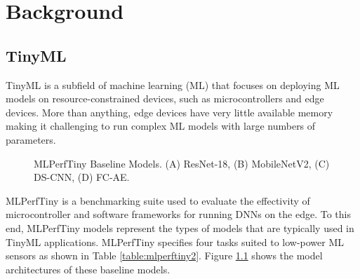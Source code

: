 \chapter{Background}

\label{chapter:background}

\section{TinyML}
\label{section:TinyML}

TinyML is a subfield of machine learning (ML) that focuses on deploying ML models on resource-constrained devices, such as microcontrollers and edge devices. More than anything, edge devices have very little available memory making it challenging to run complex ML models with large numbers of parameters.

\begin{table}[]
\label{table:mlperftiny2}
\caption{MLPerfTiny Baseline Models and Datasets}
\end{table}

\begin{figure}
    \centering
    
    \caption{MLPerfTiny Baseline Models. (A) ResNet-18, (B) MobileNetV2, (C) DS-CNN, (D) FC-AE.}
    \label{fig:mlperftiny_models}
\end{figure}

MLPerfTiny is a benchmarking suite used to evaluate the effectivity of microcontroller and software frameworks for running DNNs on the edge. To this end, MLPerfTiny models \cite{banbury2021mlperf} represent the types of models that are typically used in TinyML applications.  MLPerfTiny \cite{banbury2021mlperf} specifies four tasks suited to low-power ML sensors as shown in Table \ref{table:mlperftiny2}. Figure \ref{fig:mlperftiny_models} shows the model architectures of these baseline models.

